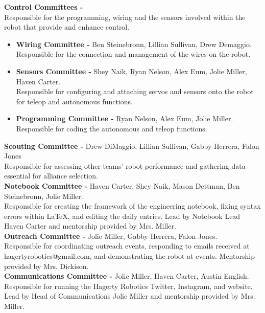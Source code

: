 \documentclass[
letterpaper, %
11pt, %
onecolumn, %
openany, %
]{article}
\begin{document}
\noindent\textbf{\Large Control Committees -} \\ Responsible for the programming, wiring and the sensors involved within the robot that provide and enhance control. 

\begin{itemize}

\item \textbf{Wiring Committee -} Ben Steinebronn, Lillian Sullivan, Drew Demaggio. \\ 
Responsible for the connection and management of the wires on the robot. 

\item \textbf{Sensors Committee -} Shey Naik, Ryan Nelson, Alex Eum, Jolie Miller, Haven Carter. \\
Responsible for configuring and attaching servos and sensors onto the robot for teleop and autonomous functions. 

\item \textbf{Programming Committee -} Ryan Nelson, Alex Eum, Jolie Miller. \\ Responsible for coding the autonomous and teleop functions. 

\end{itemize} 

\noindent\textbf{\Large Scouting Committee -} Drew DiMaggio, Lillian Sullivan, Gabby Herrera, Falon Jones \\
Responsible for assessing other teams' robot performance and gathering data essential for alliance selection. \\
\newline\noindent\textbf{\Large Notebook Committee -} Haven Carter, Shey Naik, Mason Dettman, Ben Steinebronn, Jolie Miller.  \\
Responsible for creating the framework of the engineering notebook, fixing syntax errors within \LaTeX, and editing the daily entries. Lead by Notebook Lead Haven Carter and mentorship provided by Mrs. Miller. \\
\newline\noindent\textbf{\Large Outreach Committee -} Jolie Miller, Gabby Herrera, Falon Jones.  \\
Responsible for coordinating outreach events, responding to emails received at hagertyrobotics@gmail.com, and demonstrating the robot at events. Mentorship provided by Mrs. Dickison. \\
\newline\noindent\textbf{\Large Communications Committee -} Jolie Miller, Haven Carter, Austin English.  \\
Responsible for running the Hagerty Robotics Twitter, Instagram, and website. Lead by Head of Communications Jolie Miller and mentorship provided by Mrs. Miller. \\
\end{document}
